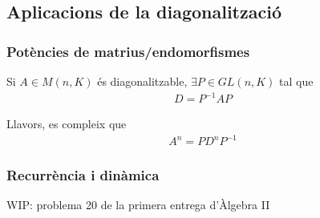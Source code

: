 \subsection{Aplicacions de la diagonalització}
\subsubsection*{Potències de matrius/endomorfismes}
Si $A \in M(n,K)$ és diagonalitzable, $\exists P \in GL(n,K)$ tal que
\begin{align}
    D = P^{-1}AP \quad
\end{align}

Llavors, es compleix que
\begin{align}
    A^{n} = P D^{n} P^{-1} \quad
\end{align}

\subsubsection*{Recurrència i dinàmica}
\begin{example}
    WIP: problema 20 de la primera entrega d'Àlgebra II
\end{example}
